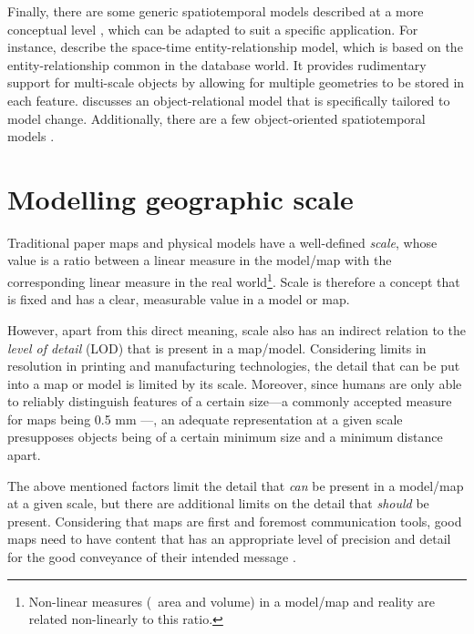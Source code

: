 Finally, there are some generic spatiotemporal models described at a more conceptual level \citep{Story95}, which can be adapted to suit a specific application.
For instance, \citet{Tryfona99} describe the space-time entity-relationship model, which is based on the entity-relationship \citep{Chen76} common in the database world.
It provides rudimentary support for multi-scale objects by allowing for multiple geometries to be stored in each feature.
\citet{Claramunt99} discusses an object-relational model that is specifically tailored to model change.
Additionally, there are a few object-oriented spatiotemporal models \citep{Worboys90}.

\section{Modelling geographic scale}
\label{se:modelling-scale}

Traditional paper maps and physical models have a well-defined \emph{scale}, whose value is a ratio between a linear measure in the model/map with the corresponding linear measure in the real world\footnote{Non-linear measures (\eg\ area and volume) in a model/map and reality are related non-linearly to this ratio.}.
Scale is therefore a concept that is fixed and has a clear, measurable value in a model or map.

However, apart from this direct meaning, scale also has an indirect relation to the \emph{level of detail} (LOD) that is present in a map/model.
Considering limits in resolution in printing and manufacturing technologies, the detail that can be put into a map or model is limited by its scale.
Moreover, since humans are only able to reliably distinguish features of a certain size---a commonly accepted measure for maps being 0.5 mm \citep{Goodchild01}---, an adequate representation at a given scale presupposes objects being of a certain minimum size and a minimum distance apart.

The above mentioned factors limit the detail that \emph{can} be present in a model/map at a given scale, but there are additional limits on the detail that \emph{should} be present.
Considering that maps are first and foremost communication tools, good maps need to have content that has an appropriate level of precision and detail for the good conveyance of their intended message \citep{Hardy12}.

